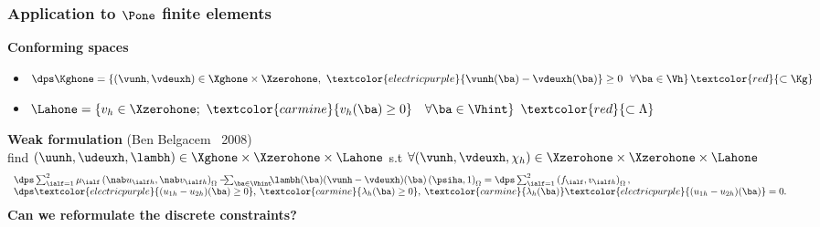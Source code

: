 \documentclass{beamer}
\begin{document}
\begin{frame}
\frametitle{Application to $\Pone$ finite elements}
\textcolor{cadmiumgreen}{\textbf{Conforming spaces}}
\begin{itemize}
\item
$\dps \Kghone=\left\{(\vunh,\vdeuxh) \in \Xghone \times \Xzerohone, \ \textcolor{electricpurple}{\vunh(\ba)-\vdeuxh(\ba)} \geq 0 \ \ \forall \ba \in \Vh \right\} \textcolor{red}{\subset \Kg}$\\
\item
$\Lahone = \left\{v_h \in \Xzerohone; \ \textcolor{carmine}{v_h({\ba}) \geq 0}  \quad \forall \ba \in \Vhint \right\} \ \textcolor{red}{\subset \Lambda}$
\end{itemize}
\vspace{0.5 cm}
\textcolor{cadmiumgreen}{\textbf{Weak formulation}} (Ben Belgacem \eal \ 2008)  \\
find $(\uunh,\udeuxh,\lambh)\in \Xghone \times \Xzerohone \times
\Lahone$ s.t  $\forall(\vunh,\vdeuxh,\chi_h) \in \Xzerohone \times \Xzerohone
\times \Lahone$
\begin{equation*}
\begin{array}{lcl}
\dps \sum_{\ialf=1}^2 \mu_\ialf \left(\nab u_{\ialf h}, \nab v_{\ialf h}\right)_{\Omega} 
- \hspace{-0.2 cm}\sum_{\ba\in \Vhint} \hspace{-0.15 cm} \lambh(\ba)(\vunh-\vdeuxh)(\ba) \left(\psiha,1\right)_{\Omega}
=  \dps \sum_{\ialf=1}^2 \left(f_\ialf,v_{\ialf h}\right)_{\Omega}, \\
\dps \textcolor{electricpurple}{(u_{1h}-u_{2h})(\ba) \geq 0}, \: \textcolor{carmine}{\lambda_h(\ba) \geq 0}, \: \textcolor{carmine}{\lambda_h(\ba)} \textcolor{electricpurple}{(u_{1h}-u_{2h})(\ba)}=0.
\end{array}
\end{equation*}
\alert{\hspace{2 cm}\textbf{Can we reformulate the discrete constraints?}}
\end{frame}
\end{document}
